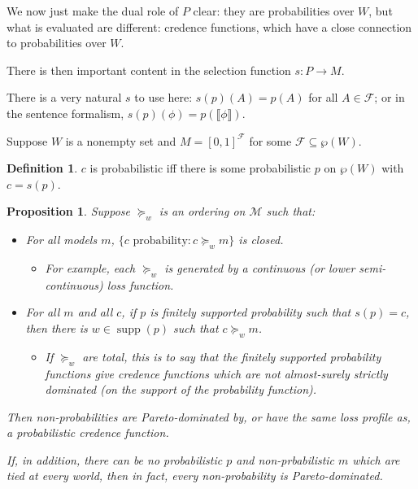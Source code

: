 \documentclass[11pt]{article}
\newtheorem{proposition}[theorem]{Proposition}
\theoremstyle{definition}
\newtheorem{definition}[theorem]{Definition}
\theoremstyle{remark}
\newcommand{\M}{\mathcal M}
\newcommand{\agenda}{\mathcal F}
\newcommand{\supp}{\operatorname{supp}}
\begin{document}
We now just make the dual role of $P$ clear: they are probabilities over $W$, but what is evaluated are different: credence functions, which have a close connection to probabilities over $W$. 

There is then important content in the selection function $s:P\to M$. 

There is a very natural $s$ to use here: $s(p)(A)=p(A)$ for all $A\in \agenda$; or in the sentence formalism, $s(p)(\phi)=p(\llbracket \phi\rrbracket)$. 


Suppose $W$ is a nonempty set and $M=[0,1]^\agenda$ for some $\agenda\subseteq \wp(W)$.

\begin{definition}
	$c$ is probabilistic iff there is some probabilistic $p$ on $\wp(W)$ with $c=s(p)$. 
\end{definition}

\begin{proposition}
	Suppose $\succeq_w$ is an ordering on $\M$ such that:
	\begin{itemize}
		\item For all models $m$, $\{c\text{ probability} : c\succeq_w m\}$ is closed. 
		\begin{itemize}
			\item For example, each $\succeq_w$ is generated by a continuous (or lower semi-continuous) loss function.
		\end{itemize}
		\item For all $m$ and all $c$, if $p$ is finitely supported probability such that $s(p)=c$, then there is $w\in \supp(p)$ such that $c\succeq_w m$.
		\begin{itemize}
			\item If $\succeq_w$ are total, this is to say that the finitely supported probability functions give credence functions which are not almost-surely strictly dominated (on the support of the probability function). 
		\end{itemize}
	\end{itemize}
	Then non-probabilities are Pareto-dominated by, or have the same loss profile as, a probabilistic credence function. 
	
	If, in addition, there can be no probabilistic $p$ and non-prbabilistic $m$ which are tied at every world, then in fact, every non-probability is Pareto-dominated. 
\end{proposition}
\end{document}
